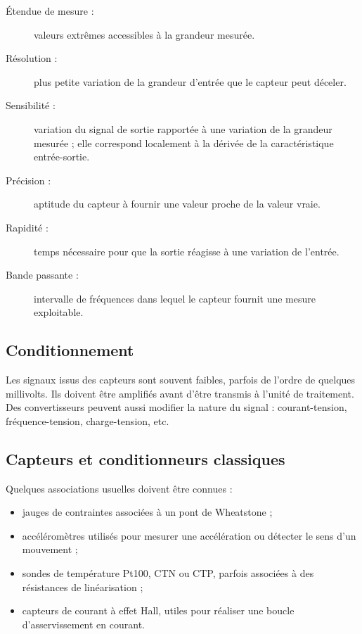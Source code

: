\begin{description}
  \item[Étendue de mesure :] valeurs extrêmes accessibles à la grandeur mesurée.
  \item[Résolution :] plus petite variation de la grandeur d'entrée que le capteur peut déceler.
  \item[Sensibilité :] variation du signal de sortie rapportée à une variation de la grandeur mesurée ; elle correspond localement à la dérivée de la caractéristique entrée-sortie.
  \item[Précision :] aptitude du capteur à fournir une valeur proche de la valeur vraie.
  \item[Rapidité :] temps nécessaire pour que la sortie réagisse à une variation de l'entrée.
  \item[Bande passante :] intervalle de fréquences dans lequel le capteur fournit une mesure exploitable.
\end{description}

\begin{center}
\end{center}

\subsection{Conditionnement}

Les signaux issus des capteurs sont souvent faibles, parfois de l'ordre de quelques millivolts. Ils doivent être amplifiés avant d'être transmis à l'unité de traitement. Des convertisseurs peuvent aussi modifier la nature du signal : courant-tension, fréquence-tension, charge-tension, etc.

\subsection{Capteurs et conditionneurs classiques}

Quelques associations usuelles doivent être connues :
\begin{itemize}
  \item jauges de contraintes associées à un pont de Wheatstone ;
  \item accéléromètres utilisés pour mesurer une accélération ou détecter le sens d'un mouvement ;
  \item sondes de température Pt100, CTN ou CTP, parfois associées à des résistances de linéarisation ;
  \item capteurs de courant à effet Hall, utiles pour réaliser une boucle d'asservissement en courant.
\end{itemize}

